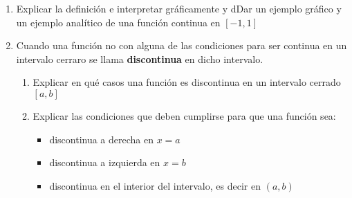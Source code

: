 \documentclass[12pt]{article}
\newtheorem*{myteo}{Teorema} %
\theoremstyle{definition}
\newtheorem*{mydef}{Definición}
\begin{document}
\begin{enumerate}
\vspace{0.3 cm}

\vspace{0.3 cm}

\item Explicar la definición e interpretar gráficamente y dDar un ejemplo gráfico y un ejemplo analítico de una función continua en $[-1,1]$
 
\item Cuando una función no con alguna de las condiciones para ser continua en un intervalo cerraro se llama \textbf{discontinua} en dicho intervalo.
\begin{enumerate}
\item Explicar en qué casos una función es discontinua en un intervalo cerrado $[a,b]$
\item Explicar las condiciones que deben cumplirse para que una función sea:
\begin{itemize}
\item discontinua a derecha en $x = a$
\item discontinua a izquierda en $x = b$
\item discontinua en el interior del intervalo, es decir en $(a,b)$
\end{itemize}
\end{enumerate}
\vspace{0.2 cm}


\end{enumerate}
\end{document}
